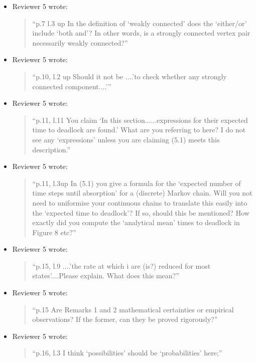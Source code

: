 \documentclass{article}
\begin{document}
\begin{itemize}
\item Reviewer 5 wrote:
\begin{quote}
``p.7 l.3 up In the definition of ‘weakly connected’ does the ‘either/or’ include ‘both and’? In other words, is a strongly connected vertex pair necessarily weakly connected?''
\end{quote}


\item Reviewer 5 wrote:
\begin{quote}
``p.10, l.2 up Should it not be ....’to check whether any strongly connected component....’''
\end{quote}


\item Reviewer 5 wrote:
\begin{quote}
``p.11, l.11 You claim ‘In this section......expressions for their expected time to deadlock are found.’ What are you referring to here? I do not see any ‘expressions’ unless you are claiming (5.1) meets this description.''
\end{quote}


\item Reviewer 5 wrote:
\begin{quote}
``p.11, l.3up In (5.1) you give a formula for the ‘expected number of time steps until absorption’ for a (discrete) Markov chain. Will you not need to uniformise your continuous chains to translate this easily into the ‘expected time to deadlock’? If so, should this be mentioned? How exactly did you compute the ‘analytical mean’ times to deadlock in Figure 8 etc?''
\end{quote}

\item Reviewer 5 wrote:
\begin{quote}
``p.15, l.9 ....’the rate at which i are (is?) reduced for most states’....Please explain. What does this mean?''
\end{quote}

\item Reviewer 5 wrote:
\begin{quote}
``p.15 Are Remarks 1 and 2 mathematical certainties or empirical observations? If the former, can they be proved rigorously?''
\end{quote}

\item Reviewer 5 wrote:
\begin{quote}
``p.16, l.3 I think ‘possibilities’ should be ‘probabilities’ here;''
\end{quote}



\end{itemize}
\end{document}
